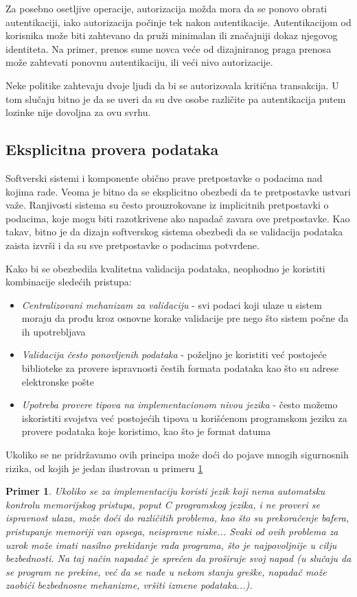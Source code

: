 \documentclass[a4paper]{article}
\newtheorem{primer}{Primer}[section]
\begin{document}
Za posebno osetljive operacije, autorizacija možda mora da se ponovo obrati autentikaciji, iako autorizacija počinje tek 
nakon autentikacije. Autentikacijom od korisnika može biti zahtevano da pruži minimalan ili značajniji dokaz njegovog identiteta. 
Na primer, prenos sume novca veće od dizajniranog praga prenosa može zahtevati ponovnu autentikaciju, ili veći nivo autorizacije.

Neke politike zahtevaju dvoje ljudi da bi se autorizovala kritična transakcija. U tom slučaju 
bitno je da se uveri da su dve osobe različite pa autentikacija putem lozinke nije dovoljna za ovu svrhu.

\subsection{Eksplicitna provera podataka}
Softverski sistemi i komponente obično prave pretpostavke o podacima nad kojima rade. Veoma je bitno da se eksplicitno obezbedi da te pretpostavke ustvari važe. Ranjivosti sistema su često prouzrokovane iz implicitnih pretpostavki o podacima, koje mogu biti razotkrivene ako napadač zavara ove pretpostavke.
Kao takav, bitno je da dizajn softverskog sistema obezbedi da se validacija podataka zaista izvrši i da su sve 
pretpostavke o podacima potvrđene.\cite{Top10Flaws}

Kako bi se obezbedila kvalitetna validacija podataka, neophodno je koristiti kombinacije sledećih pristupa:
\begin{itemize}
	\item \textit{Centralizovani mehanizam za validaciju} - svi podaci koji ulaze u sistem moraju da prođu kroz osnovne korake validacije pre nego što sistem počne da ih upotrebljava
	\item \textit{Validacija često ponovljenih podataka} - poželjno je koristiti već postojeće biblioteke za provere ispravnosti čestih formata podataka kao što su adrese elektronske pošte
	\item \textit{Upotreba provere tipova na implementacionom nivou jezika} - često možemo iskoristiti svojstva već postojećih tipova u korišćenom programskom jeziku za provere podataka koje koristimo, kao što je format datuma
\end{itemize}
Ukoliko se ne pridržavamo ovih principa može doći do pojave mnogih sigurnosnih rizika, od kojih je jedan ilustrovan u primeru \ref{primer5}

\begin{primer}
	\label{primer5}
	Ukoliko se za implementaciju koristi jezik koji nema automatsku kontrolu memorijskog pristupa, poput C programskog jezika, i ne proveri se ispravnost ulaza, može doći do različitih problema, kao što su prekoračenje bafera, pristupanje memoriji van opsega, neispravne niske... Svaki od ovih problema za uzrok može imati nasilno prekidanje rada programa, što je najpovoljnije u cilju bezbednosti. Na taj način napadač je sprečen da proširuje svoj napad (u slučaju da se program ne prekine, već da se nađe u nekom stanju greške, napadač može zaobići bezbednosne mehanizme, vršiti izmene podataka...).
\end{primer}
\end{document}
